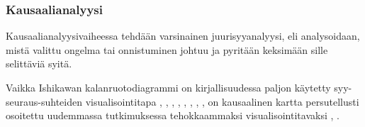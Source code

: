\subsubsection{Kausaalianalyysi}
Kausaalianalyysivaiheessa tehdään varsinainen juurisyyanalyysi, eli analysoidaan, mistä valittu ongelma tai onnistuminen johtuu ja pyritään keksimään sille selittäviä syitä. 

Vaikka Ishikawan kalanruotodiagrammi \citep{ishikawa1990introduction} on kirjallisuudessa paljon käytetty syy-seuraus-suhteiden visualisointitapa \citep{kalinowski2012evidence}, \citep{Bjornson2009}, \citep{de2004learning}, \citep{staalhane2004root}, \citep{dingsoyr2003extending}, \citep{staalhane2003post}, \citep{birk2002postmortem}, \citep{card1998learning}, on kausaalinen kartta persutellusti osoitettu uudemmassa tutkimuksessa tehokkaammaksi visualisointitavaksi \citep{Bjornson2009}, \citep{Lehtinen2011}. 

